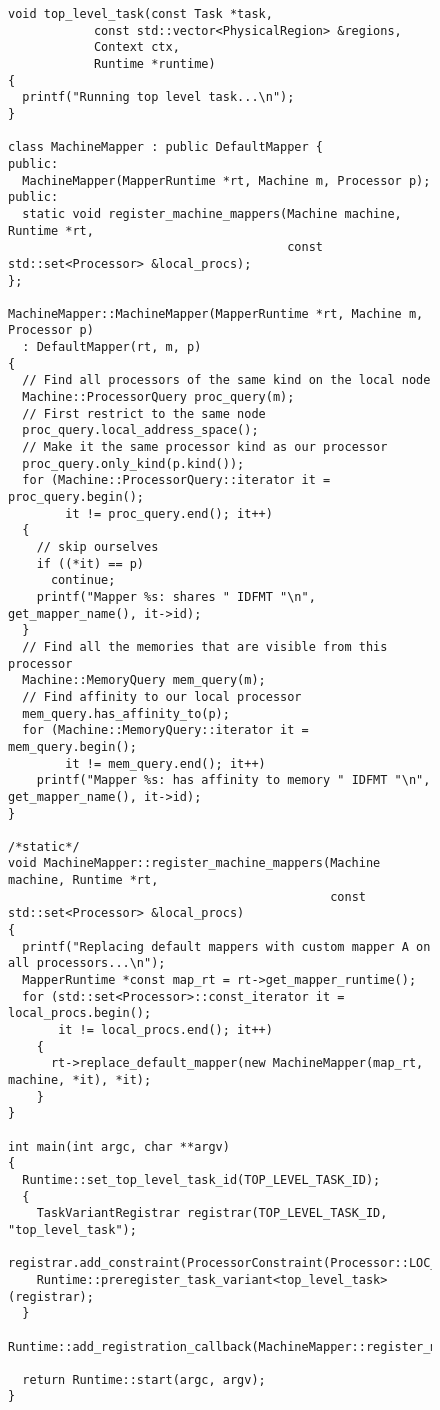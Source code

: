 \begin{figure}
\begin{lstlisting}
void top_level_task(const Task *task,
		    const std::vector<PhysicalRegion> &regions,
		    Context ctx, 
		    Runtime *runtime)
{
  printf("Running top level task...\n");
}

class MachineMapper : public DefaultMapper {
public:
  MachineMapper(MapperRuntime *rt, Machine m, Processor p);
public:
  static void register_machine_mappers(Machine machine, Runtime *rt,
                                       const std::set<Processor> &local_procs);
};

MachineMapper::MachineMapper(MapperRuntime *rt, Machine m, Processor p)
  : DefaultMapper(rt, m, p)
{
  // Find all processors of the same kind on the local node
  Machine::ProcessorQuery proc_query(m);
  // First restrict to the same node
  proc_query.local_address_space();
  // Make it the same processor kind as our processor
  proc_query.only_kind(p.kind());
  for (Machine::ProcessorQuery::iterator it = proc_query.begin(); 
        it != proc_query.end(); it++)
  {
    // skip ourselves
    if ((*it) == p)
      continue;
    printf("Mapper %s: shares " IDFMT "\n", get_mapper_name(), it->id);
  }
  // Find all the memories that are visible from this processor
  Machine::MemoryQuery mem_query(m);
  // Find affinity to our local processor
  mem_query.has_affinity_to(p);
  for (Machine::MemoryQuery::iterator it = mem_query.begin();
        it != mem_query.end(); it++)
    printf("Mapper %s: has affinity to memory " IDFMT "\n", get_mapper_name(), it->id);
}

/*static*/
void MachineMapper::register_machine_mappers(Machine machine, Runtime *rt,
                                             const std::set<Processor> &local_procs)
{
  printf("Replacing default mappers with custom mapper A on all processors...\n");
  MapperRuntime *const map_rt = rt->get_mapper_runtime();
  for (std::set<Processor>::const_iterator it = local_procs.begin();
       it != local_procs.end(); it++)
    {
      rt->replace_default_mapper(new MachineMapper(map_rt, machine, *it), *it);
    }
}

int main(int argc, char **argv)
{
  Runtime::set_top_level_task_id(TOP_LEVEL_TASK_ID);
  {
    TaskVariantRegistrar registrar(TOP_LEVEL_TASK_ID, "top_level_task");
    registrar.add_constraint(ProcessorConstraint(Processor::LOC_PROC));
    Runtime::preregister_task_variant<top_level_task>(registrar);
  }
  Runtime::add_registration_callback(MachineMapper::register_machine_mappers);

  return Runtime::start(argc, argv);
}
\end{lstlisting}
\caption{}
\label{fig:mapper_machine}
\end{figure}


